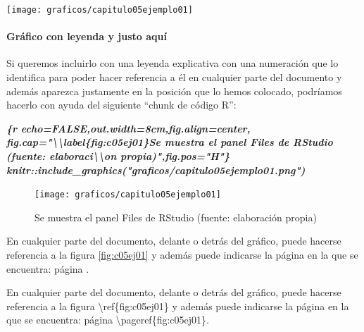 \documentclass[12pt,a4paper,oneside,]{article}
\newenvironment{Shaded}{\begin{snugshade}}{\end{snugshade}}
\newcommand{\InformationTok}[1]{\textcolor[rgb]{0.56,0.35,0.01}{\textbf{\textit{#1}}}}
\newcommand{\NormalTok}[1]{#1}
\let\oldparagraph\paragraph
\renewcommand{\paragraph}[1]{\oldparagraph{#1}\mbox{}}
\numberwithin{dummy}{section}
\theoremstyle{ocrenumbox}
\theoremstyle{blacknumex}
\theoremstyle{blacknumbox}
\theoremstyle{ocrenum}
\theoremstyle{ocrenum}
\begin{document}
\begin{center}\texttt{[image: graficos/capitulo05ejemplo01]} \end{center}

\hypertarget{gruxe1fico-con-leyenda-y-justo-aquuxed}{%
\paragraph{Gráfico con leyenda y justo
aquí}\label{gruxe1fico-con-leyenda-y-justo-aquuxed}}

Si queremos incluirlo con una leyenda explicativa con una numeración que
lo identifica para poder hacer referencia a él en cualquier parte del
documento y además aparezca justamente en la posición que lo hemos
colocado, podríamos hacerlo con ayuda del siguiente ``chunk de código
R'':

\begin{Shaded}
\begin{Highlighting}[]
\InformationTok{\textasciigrave{}\textasciigrave{}\textasciigrave{}\{r echo=FALSE,out.width=\textquotesingle{}8cm\textquotesingle{},fig.align=\textquotesingle{}center\textquotesingle{},}
\InformationTok{fig.cap="\textbackslash{}\textbackslash{}label\{fig:c05ej01\}Se muestra el panel Files de RStudio }
\InformationTok{(fuente: elaboraci\textbackslash{}\textbackslash{}\textquotesingle{}on propia)",fig.pos="H"\}}
\InformationTok{knitr::include\_graphics("graficos/capitulo05ejemplo01.png")}
\InformationTok{\textasciigrave{}\textasciigrave{}\textasciigrave{}}
\end{Highlighting}
\end{Shaded}

\begin{figure}[H]

{\centering \texttt{[image: graficos/capitulo05ejemplo01]} 

}

\caption{\label{fig:c05ej01}Se muestra el panel Files de RStudio (fuente: elaboraci\'on propia)}\label{fig:unnamed-chunk-22}
\end{figure}

En cualquier parte del documento, delante o detrás del gráfico, puede
hacerse referencia a la figura \ref{fig:c05ej01} y además puede
indicarse la página en la que se encuentra: página
\pageref{fig:c05ej01}.

\begin{Shaded}
\begin{Highlighting}[]
\NormalTok{En cualquier parte del documento, delante o detrás del gráfico, puede }
\NormalTok{hacerse referencia a la figura \textbackslash{}ref\{fig:c05ej01\} y además puede indicarse }
\NormalTok{la página en la que se encuentra: página \textbackslash{}pageref\{fig:c05ej01\}.}
\end{Highlighting}
\end{Shaded}
\end{document}
